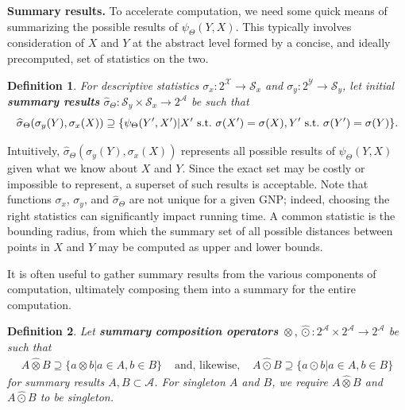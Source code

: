 \documentclass{article}
\newtheorem{definition} {Definition}
\newcommand{\killspace}{\vspace{-0.08in}}
\newcommand{\GNP}[1][\psi]{{#1}_{\Theta}}
\newcommand{\sigmahat}{\mathbin{\widehat{\sigma}}}
\newcommand{\otimeshat}{\mathbin{\widehat{\otimes}}}
\newcommand{\odothat}{\mathbin{\widehat{\odot}}}
\newcommand{\st}{{\rm~s.t.~}}
\begin{document}

{\bf Summary results.}
To accelerate computation, we need some quick means of summarizing the possible results of $\GNP(Y,X)$.
This typically involves consideration of $X$ and $Y$ at the abstract level formed by a concise, and ideally precomputed, set of statistics on the two.
\begin{definition}
  For descriptive statistics $\sigma_x \colon 2^{\mathcal{X}} \to
  \mathcal{S}_x$ and $\sigma_y \colon 2^{\mathcal{Y}} \to
  \mathcal{S}_y$, let initial {\bf summary results} $\GNP[\sigmahat]
  \colon \mathcal{S}_y \times \mathcal{S}_x \to 2^\mathcal{A}$ be such
  that
  \[
  \GNP[\sigmahat](\sigma_y(Y),\sigma_x(X)) \supseteq \{\GNP(Y',X') | X' \st \sigma(X') = \sigma(X), Y' \st \sigma(Y') = \sigma(Y)\}.
  \]
\end{definition}

\noindent Intuitively, $\GNP[\sigmahat](\sigma_y(Y),\sigma_x(X))$ represents all possible results of $\GNP(Y,X)$ given what we know about $X$ and $Y$.
Since the exact set may be costly or impossible to represent, a superset of such results is acceptable.
Note that functions $\sigma_x$, $\sigma_y$, and $\GNP[\sigmahat]$ are not unique for a given GNP; indeed, choosing the right statistics can significantly impact running time.
A common statistic is the bounding radius, from which the summary set of all possible distances between points in $X$ and $Y$ may be computed as upper and lower bounds.

It is often useful to gather summary results from the various components of computation, ultimately composing them into a summary for the entire computation.
\begin{definition}
  Let {\bf summary composition operators} $\otimeshat, \odothat \colon
  2^{\mathcal{A}} \times 2^{\mathcal{A}} \to 2^{\mathcal{A}}$ be such
  that
  \[ \begin{array}{rcl}
    A \otimeshat B \supseteq \{a \otimes b | a \in A, b \in B\} & \mbox{ and, likewise, } & A \odothat B \supseteq \{a \odot b | a \in A, b \in B\}
  \end{array} \]
  for summary results $A,B \subset \mathcal{A}$.  For singleton $A$
  and $B$, we require $A \otimeshat B$ and $A \odothat B$ to be
  singleton.
\end{definition}
\killspace
\end{document}
